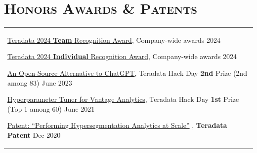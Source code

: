 \documentclass[letterpaper,11pt]{article} %
\begin{document}
\section{\Large\bf\textsc{Honors Awards \& Patents}}
\begin{tabular}{p{18.5cm}}
\href{}{Teradata 2024 \textbf{Team} Recognition Award}, {{Company-wide awards}} \hfill 2024
\vspace{.1mm}

\href{}{Teradata 2024 \textbf{Individual} Recognition Award}, {{Company-wide awards}} \hfill 2024
 \vspace{.1mm}

\href{}{An Open-Source Alternative to ChatGPT}, {{Teradata Hack Day \textbf {2nd} Prize (2nd among 83)}} \hfill June 2023
 \vspace{.1mm}
 
\href{}{Hyperparameter Tuner for Vantage Analytics}, {{Teradata Hack Day \textbf {1st} Prize} (Top 1 among 60)} \hfill June 2021
 \vspace{.1mm}
 
 \href{}{Patent: “Performing Hypersegmentation Analytics at Scale”} , {\textbf{Teradata Patent}} \hfill Dec 2020
 \vspace{.1mm}





\end{tabular}
\end{document}
